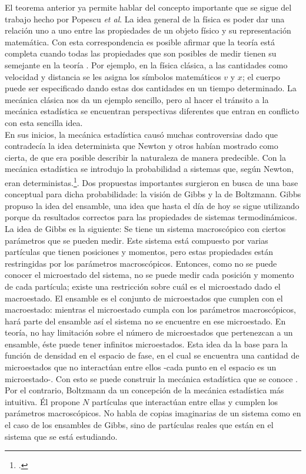 El teorema anterior ya permite hablar del concepto importante que se sigue del trabajo hecho por Popescu \textit{et al}. La idea general de la física es poder dar una relación uno a uno entre las propiedades de un objeto físico y su representación matemática. Con esta correspondencia es posible afirmar que la teoría está completa cuando todas las propiedades que son posibles de medir tienen su semejante en la teoría \cite{Decoherence}. Por ejemplo, en la física clásica, a las cantidades como velocidad y distancia se les asigna los símbolos matemáticos $v$ y $x$; el cuerpo puede ser especificado dando estas dos cantidades en un tiempo determinado. La mecánica clásica nos da un ejemplo sencillo, pero al hacer el tránsito a la mecánica estadística se encuentran perspectivas diferentes que entran en conflicto con esta sencilla idea. 
\\
En sus inicios, la mecánica estadística causó muchas controversias dado que contradecía la idea determinista que Newton y otros habían mostrado como cierta, de que era posible describir la naturaleza de manera predecible. Con la mecánica estadística se introdujo la probabilidad a sistemas que, según Newton, eran deterministas.\footcite{ En este punto se debe hacer claro que la necesidad de recurrir a la probabilidad existía por falta de conocimiento pero no por un indeterminismo intrínseco como en la mecánica cuántica}. Dos propuestas importantes surgieron en busca de una base conceptual para dicha probabilidade: la visión de Gibbs y la de Boltzmann. Gibbs propuso la idea del ensamble, una idea que hasta el día de hoy se sigue utilizando porque da resultados correctos para las propiedades de sistemas termodinámicos.\\
La idea de Gibbs es la siguiente: Se tiene un sistema macroscópico con ciertos parámetros que se pueden medir. Este sistema está compuesto por varias partículas que tienen posiciones y momentos, pero estas propiedades están restringidas por los parámetros macroscópicos. Entonces, como no se puede conocer el microestado del sistema, no se puede medir cada posición y momento de cada partícula; existe una restricción sobre cuál es el microestado dado el macroestado. El ensamble es el conjunto de microestados que cumplen con el macroestado: mientras el microestado cumpla con los parámetros macroscópicos, hará parte del ensamble así el sistema no se encuentre en ese microestado. En teoría, no hay limitación sobre el número de microestados que pertenezcan a un ensamble, éste puede tener infinitos microestados. Esta idea da la base para la función de densidad en el espacio de fase, en el cual se encuentra una cantidad de microestados que no interactúan entre ellos -cada punto en el espacio es un microestado-. Con esto se puede construir la mecánica estadística que se conoce \cite{PathriaStat}. Por el contrario, Boltzmann da un concepción de la mecánica estadística más intuitiva. Él propone $N$ partículas que interactúan entre ellas y cumplen los parámetros macroscópicos. No habla de copias imaginarias de un sistema como en el caso de los ensambles de Gibbs, sino de partículas reales que están en el sistema que se está estudiando. 
